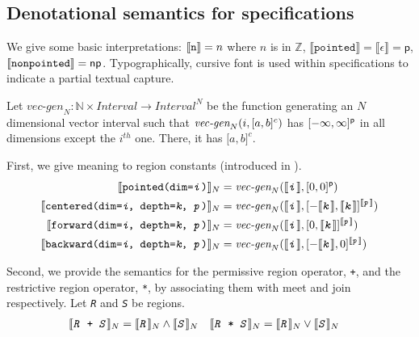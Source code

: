 \documentclass{article}
\theoremstyle{definition}
\theoremstyle{plain}
\newcommand{\interp}[1]{\llbracket\texttt{#1}\rrbracket}
\newcommand{\interv}[3]{\textnormal{$\lbrack#1,#2\rbrack^{#3}$}}
\newcommand{\vecgen}[3]{\textnormal{$\textit{vec-gen}_{#1}(#2,#3)$}}
\begin{document}
\subsection{Denotational semantics for specifications}

We give some basic interpretations: $\interp{\texttt{n}} = n$ where $n$ is in
$\mathbb{Z}$, $\interp{pointed} = \llbracket \epsilon \rrbracket = \textsf{p}$,
$\interp{\texttt{nonpointed}} = \textsf{np}$. Typographically, cursive font is
used within specifications to indicate a partial textual capture.

Let $\textit{vec-gen}_N : \mathbb{N} \times \textit{Interval} \to
\textit{Interval}^N$ be the function generating an $N$ dimensional vector
interval such that \vecgen{N}{i}{\interv{a}{b}{c}} has
$\interv{-\infty}{\infty}{\textsf{p}}$ in all dimensions except the $i^{th}$
one. There, it has \interv{a}{b}{c}.

First, we give meaning to region constants (introduced in \Cref{}).
%
\begin{align*}
  \interp{\texttt{pointed(dim=\textit{i})}}_N & =
    \vecgen{N}{\interp{\textit{i}}}{\interv{0}{0}{\textsf{p}}}\\
%
  \interp{\texttt{centered(dim=\textit{i}, depth=\textit{k}, \textit{p})}}_N & =
    \vecgen{N}
           {\interp{\textit{i}}}
           {\interv{-\interp{\textit{k}}}
                   {\interp{\textit{k}}}
                   {\interp{\textit{p}}}
           } \\
%
  \interp{\texttt{forward(dim=\textit{i}, depth=\textit{k}, \textit{p})}}_N & =
    \vecgen{N}
           {\interp{\textit{i}}}
           {\interv{0}
                   {\interp{\textit{k}}}
                   {\interp{\textit{p}}}
           } \\
%
  \interp{\texttt{backward(dim=\textit{i}, depth=\textit{k}, \textit{p})}}_N & =
    \vecgen{N}
           {\interp{\textit{i}}}
           {\interv{-\interp{\textit{k}}}
                   {0}
                   {\interp{\textit{p}}}
           }
\end{align*}

Second, we provide the semantics for the permissive region operator, \texttt{+},
and the restrictive region operator, \texttt{*}, by associating them with meet
and join respectively. Let \texttt{\textit{R}} and \texttt{\textit{S}} be
regions.
%
\begin{align*}
  \interp{\texttt{\textit{R} + \textit{S}}}_N & =
    \interp{\texttt{\textit{R}}}_N \wedge \interp{\texttt{\textit{S}}}_N
&
  \interp{\texttt{\textit{R} * \textit{S}}}_N & =
    \interp{\texttt{\textit{R}}}_N \vee \interp{\texttt{\textit{S}}}_N
\end{align*}
\end{document}
